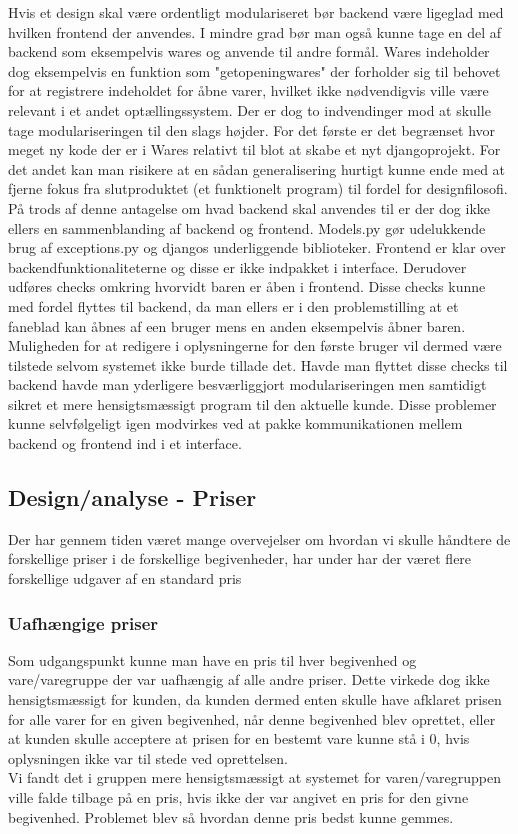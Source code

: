 \documentclass[]{article}
\begin{document}
Hvis et design skal være ordentligt modulariseret bør backend være ligeglad med hvilken frontend der anvendes. I mindre grad bør man også kunne tage en del af backend som eksempelvis wares og anvende til andre formål. Wares indeholder dog eksempelvis en funktion som "getopeningwares" der forholder sig til behovet for at registrere indeholdet for åbne varer, hvilket ikke nødvendigvis ville være relevant i et andet optællingssystem. Der er dog to indvendinger mod at skulle tage modulariseringen til den slags højder. For det første er det begrænset hvor meget ny kode der er i Wares relativt til blot at skabe et nyt djangoprojekt. For det andet kan man risikere at en sådan generalisering hurtigt kunne ende med at fjerne fokus fra slutproduktet (et funktionelt program) til fordel for designfilosofi.\\
\indent På trods af denne antagelse om hvad backend skal anvendes til er der dog ikke ellers en sammenblanding af backend og frontend. Models.py gør udelukkende brug af exceptions.py og djangos underliggende biblioteker. 
\indent Frontend er klar over backendfunktionaliteterne og disse er ikke indpakket i interface. Derudover udføres checks omkring hvorvidt baren er åben i frontend. Disse checks kunne med fordel flyttes til backend, da man ellers er i den problemstilling at et faneblad kan åbnes af een bruger mens en anden eksempelvis åbner baren. Muligheden for at redigere i oplysningerne for den første bruger vil dermed være tilstede selvom systemet ikke burde tillade det. Havde man flyttet disse checks til backend havde man yderligere besværliggjort modulariseringen men samtidigt sikret et mere hensigtsmæssigt program til den aktuelle kunde. Disse problemer kunne selvfølgeligt igen modvirkes ved at pakke kommunikationen mellem backend og frontend ind i et interface.

\subsection{Design/analyse - Priser}

Der har gennem tiden været mange overvejelser om hvordan vi skulle håndtere de forskellige priser i de forskellige begivenheder, har under har der været flere forskellige udgaver af en standard pris

\subsubsection{Uafhængige priser}
Som udgangspunkt kunne man have en pris til hver begivenhed og vare/varegruppe der var uafhængig af alle andre priser. Dette virkede dog ikke hensigtsmæssigt for kunden, da kunden dermed enten skulle have afklaret prisen for alle varer for en given begivenhed, når denne begivenhed blev oprettet, eller at kunden skulle acceptere at prisen for en bestemt vare kunne stå i 0, hvis oplysningen ikke var til stede ved oprettelsen.\\
Vi fandt det i gruppen mere hensigtsmæssigt at systemet for varen/varegruppen ville falde tilbage på en pris, hvis ikke der var angivet en pris for den givne begivenhed. Problemet blev så hvordan denne pris bedst kunne gemmes.
\end{document}
